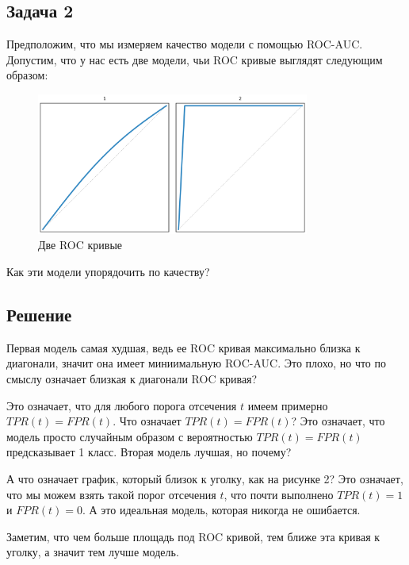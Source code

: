 \subsection*{Задача 2}
Предположим, что мы измеряем качество модели с помощью ROC-AUC. Допустим, что у нас есть две модели, чьи ROC кривые выглядят следующим образом:
\begin{figure}[h]
    \centering
    \includegraphics[width=0.8\textwidth]{chapters/feature_selection/roc_curves_comparison_1.png}
    \caption{Две ROC кривые}
\end{figure}
Как эти модели упорядочить по качеству?

\subsection*{Решение}
Первая модель самая худшая, ведь ее ROC кривая максимально близка к диагонали, значит она имеет миниимальную ROC-AUC.
Это плохо, но что по смыслу означает близкая к диагонали ROC кривая?

Это означает, что для любого порога отсечения $t$ имеем примерно $TPR(t) = FPR(t)$.
Что означает $TPR(t) = FPR(t)$? Это означает, что модель просто случайным образом с вероятностью $TPR(t)=FPR(t)$ предсказывает 1 класс.
Вторая модель лучшая, но почему?

А что означает график, который близок к уголку, как на рисунке 2?
Это означает, что мы можем взять такой порог отсечения $t$, что почти выполнено $TPR(t) = 1$ и $FPR(t) = 0$.
А это идеальная модель, которая никогда не ошибается.

Заметим, что чем больше площадь под ROC кривой, тем ближе эта кривая к уголку, а значит тем лучше модель.

